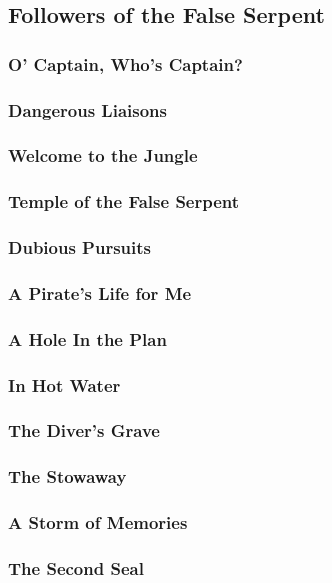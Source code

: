     \newpage
    \subsection{Followers of the False Serpent} \vspace*{\fill}
    \newpage
        \subsubsection{O' Captain, Who's Captain?}
        \subsubsection{Dangerous Liaisons}
        \subsubsection{Welcome to the Jungle}
        \subsubsection{Temple of the False Serpent}
        \subsubsection{Dubious Pursuits}
        \subsubsection{A Pirate's Life for Me}
        \subsubsection{A Hole In the Plan}
        \subsubsection{In Hot Water}
        \subsubsection{The Diver's Grave}
        \subsubsection{The Stowaway}
        \subsubsection{A Storm of Memories}
        \subsubsection{The Second Seal}
        
